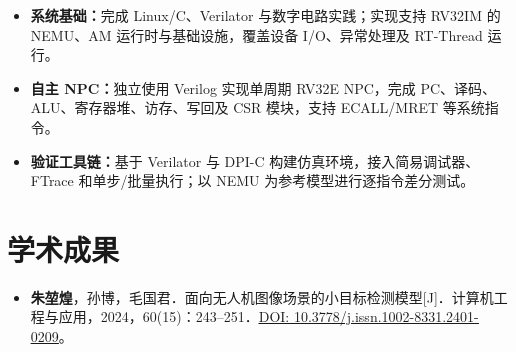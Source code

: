 \documentclass[UTF8,10pt,a4paper,fontset=none]{ctexart}
\newcommand{\lk}[2]{\href{#1}{\underline{#2}}}
\begin{document}
\begin{itemize}
\item \textbf{系统基础：}完成 Linux/C、Verilator 与数字电路实践；实现支持 RV32IM 的 NEMU、AM 运行时与基础设施，覆盖设备 I/O、异常处理及 RT-Thread 运行。
\item \textbf{自主 NPC：}独立使用 Verilog 实现单周期 RV32E NPC，完成 PC、译码、ALU、寄存器堆、访存、写回及 CSR 模块，支持 ECALL/MRET 等系统指令。
\item \textbf{验证工具链：}基于 Verilator 与 DPI-C 构建仿真环境，接入简易调试器、FTrace 和单步/批量执行；以 NEMU 为参考模型进行逐指令差分测试。
\end{itemize}
\section{学术成果}
\begin{itemize}
\item \textbf{朱堃煌}，孙博，毛国君．面向无人机图像场景的小目标检测模型[J]．计算机工程与应用，2024，60(15)：243--251．\lk{https://doi.org/10.3778/j.issn.1002-8331.2401-0209}{DOI: 10.3778/j.issn.1002-8331.2401-0209}。
\end{itemize}
\end{document}
